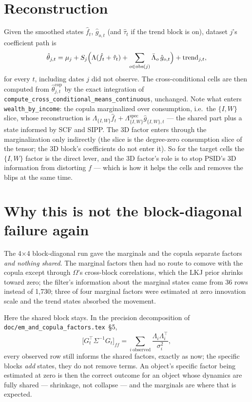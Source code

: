 \documentclass[11pt]{article}
\newcommand{\cop}{\mathrm{cop}}
\newcommand{\code}[1]{\texttt{#1}}
\newcommand{\obs}{\mathrm{obs}}
\begin{document}
\section{Reconstruction}\label{sec:recon}

Given the smoothed states $\hat f_t$, $\hat g_{o,t}$ (and $\hat\tau_t$ if the
trend block is on), dataset $j$'s coefficient path is
\begin{equation}
  \hat\theta_{j,t} = \mu_j + S_j\Bigl( \Lambda(\hat f_t + \hat\tau_t) + \sum_{o\in\obs(j)} \bar\Lambda_o\,\hat g_{o,t} \Bigr) + \mathrm{trend}_{j,t},
\end{equation}
for every $t$, including dates $j$ did not observe. The cross-conditional cells
are then computed from $\hat\theta^{\cop}_{j,t}$ by the exact integration of
\code{compute\_cross\_conditional\_means\_continuous}, unchanged. Note what
enters \code{wealth\_by\_income}: the copula marginalized over consumption,
i.e.\ the $\{I,W\}$ slice, whose reconstruction is
$\Lambda_{\{I,W\}}\hat f_t + \Lambda_{\{I,W\}}^{\text{spec}}\hat g_{\{I,W\},t}$
--- the shared part plus a state informed by SCF and SIPP. The 3D factor enters
through the marginalization only indirectly (the slice is the degree-zero
consumption slice of the tensor; the 3D block's coefficients do not enter it).
So for the target cells the $\{I,W\}$ factor is the direct lever, and the 3D
factor's role is to stop PSID's 3D information from distorting $f$ --- which is
how it helps the cells and removes the blips at the same time.

\section{Why this is not the block-diagonal failure again}\label{sec:why}

The 4$\times$4 block-diagonal run gave the marginals and the copula separate
factors \emph{and nothing shared}. The marginal factors then had no route to
comove with the copula except through $\Omega$'s cross-block correlations,
which the LKJ prior shrinks toward zero; the filter's information about the
marginal states came from 36 rows instead of 1,730; three of four marginal
factors were estimated at zero innovation scale and the trend states absorbed
the movement.

Here the shared block stays. In the precision decomposition of
\code{doc/em\_and\_copula\_factors.tex}~\S5,
\begin{equation}
  \bigl[G_t^{\top}\Sigma^{-1}G_t\bigr]_{ff} = \sum_{i\ \text{observed}} \frac{\Lambda_i\Lambda_i^{\top}}{\sigma^2_{i}},
\end{equation}
every observed row still informs the shared factors, exactly as now; the
specific blocks \emph{add} states, they do not remove terms. An object's
specific factor being estimated at zero is then the correct outcome for an
object whose dynamics are fully shared --- shrinkage, not collapse --- and the
marginals are where that is expected.
\end{document}
